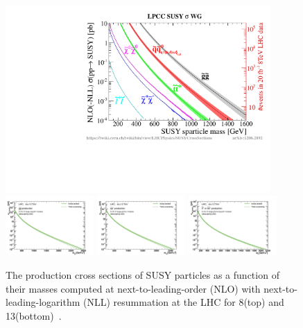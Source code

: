 \begin{figure}
\centering
\includegraphics[width=0.9\textwidth]{figs/theory/xsections_strong.pdf}\\
\includegraphics[width=0.3\textwidth]{figs/theory/xsec_gg_200_3050.pdf}
\includegraphics[width=0.3\textwidth]{figs/theory/xs_squark_200_2700.pdf}
\includegraphics[width=0.3\textwidth]{figs/theory/xs_stop_100_2200.pdf}
\caption{The production cross sections of SUSY particles as a function
  of their masses computed at next-to-leading-order (NLO) with next-to-leading-logarithm (NLL)
  resummation at the LHC for 8\TeV (top) and 13\TeV (bottom)~\cite{NLONLL1,NLONLL2,NLONLL3,NLONLL4,NLONLL5,NLONLLerr,Borschensky:2014cia}.\label{fig:xsecsusy}}
\end{figure}


